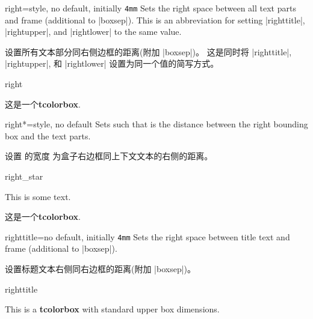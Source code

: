 \enlargethispage*{1cm}

\begin{docTcbKey}{right}{=}{style, no default, initially \texttt{4mm}}
  Sets the right space between all text parts and frame (additional to |boxsep|).
  This is an abbreviation for setting
  |righttitle|, |rightupper|, and |rightlower| to the same value.

设置所有文本部分同右侧边框的距离(附加 |boxsep|)。
这是同时将 |righttitle|, |rightupper|, 和 |rightlower| 设置为同一个值的简写方式。
\begin{exdispExample}{right}

\begin{tcolorbox}[width=5cm,right=2cm]
这是一个\textbf{tcolorbox}.
\end{tcolorbox}
\end{exdispExample}
\end{docTcbKey}





  
\begin{docTcbKey}[][doc new=2017-02-16]{right*}{=}{style, no default}
  Sets  such that  is the distance between
  the right bounding box and the text parts.

设置  的宽度  为盒子右边框同上下文文本的右侧的距离。
\begin{exdispExample}{right_star}

\flushright This is some text.
\begin{tcolorbox}[grow to right by=5mm,right*=0mm,
  halign=right,enhanced,show bounding box]
这是一个\textbf{tcolorbox}.
\end{tcolorbox}
\end{exdispExample}
\end{docTcbKey}



\begin{docTcbKey}{righttitle}{=}{no default, initially \texttt{4mm}}
  Sets the right space between title text and frame (additional to |boxsep|).

设置标题文本右侧同右边框的距离(附加 |boxsep|)。
  \begin{exdispExample}{righttitle}

\begin{tcolorbox}[width=5cm,righttitle=2cm,title=My very long title text]
This is a \textbf{tcolorbox} with standard upper box dimensions.
\end{tcolorbox}
\end{exdispExample}
\end{docTcbKey}


